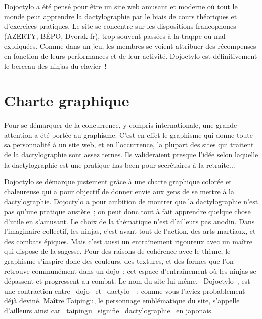 \documentclass[a4paper,12pt]{article}
\begin{document}
Dojoctylo a été pensé pour être un site web amusant et moderne où tout le monde peut apprendre la dactylographie par le biais de cours théoriques et d'exercices pratiques. Le site se concentre sur les dispositions francophones (AZERTY, BÉPO, Dvorak-fr), trop souvent passées à la trappe ou mal expliquées. Comme dans un jeu, les membres se voient attribuer des récompenses en fonction de leurs performances et de leur activité. Dojoctylo est définitivement le berceau des ninjas du clavier~!

\section{Charte graphique}

Pour se démarquer de la concurrence, y compris internationale, une grande attention a été portée au graphisme. C'est en effet le graphisme qui donne toute sa personnalité à un site web, et en l'occurrence, la plupart des sites qui traitent de la dactylographie sont assez ternes. Ils valideraient presque l'idée selon laquelle la dactylographie est une pratique has-been pour secrétaires à la retraite...

Dojoctylo se démarque justement grâce à une charte graphique colorée et chaleureuse qui a pour objectif de donner envie aux gens de se mettre à la dactylographie. Dojoctylo a pour ambition de montrer que la dactylographie n'est pas qu'une pratique austère~; on peut donc tout à fait apprendre quelque chose d'utile en s'amusant. Le choix de la thématique n'est d'ailleurs pas anodin. Dans l'imaginaire collectif, les ninjas, c'est avant tout de l'action, des arts martiaux, et des combats épiques. Mais c'est aussi un entraînement rigoureux avec un maître qui dispose de la sagesse. Pour des raisons de cohérence avec le thème, le graphisme s'inspire donc des couleurs, des textures, et des formes que l'on retrouve communément dans un dojo~; cet espace d'entraînement où les ninjas se dépassent et progressent au combat. Le nom du site lui-même, \og~Dojoctylo~\fg, est une contraction entre \og~dojo~\fg{} et \og~dactylo~\fg~; comme vous l'aviez probablement déjà deviné. Maître Taipingu, le personnage emblématique du site, s'appelle d'ailleurs ainsi car \og~taipingu~\fg{} signifie \og~dactylographie~\fg{} en japonais.
\end{document}
